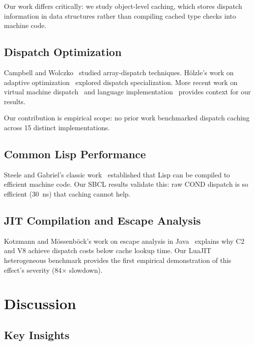 \documentclass[sigplan,final]{acmart}
\begin{document}
Our work differs critically: we study object-level caching, which stores dispatch information in
data structures rather than compiling cached type checks into machine code.

\subsection{Dispatch Optimization}

Campbell and Wolczko~\cite{campbell1992array} studied array-dispatch techniques. Hölzle's work
on adaptive optimization~\cite{hoelzle1994adaptive} explored dispatch specialization. More recent
work on virtual machine dispatch~\cite{ahn2014fast} and language implementation~\cite{tobin2017performance}
provides context for our results.

Our contribution is empirical scope: no prior work benchmarked dispatch caching across 15
distinct implementations.

\subsection{Common Lisp Performance}

Steele and Gabriel's classic work~\cite{steele1990lisp} established that Lisp can be compiled
to efficient machine code. Our SBCL results validate this: raw COND dispatch is so efficient
(30~ns) that caching cannot help.

\subsection{JIT Compilation and Escape Analysis}

Kotzmann and Mössenböck's work on escape analysis in Java~\cite{kotzmann2005escape} explains
why C2 and V8 achieve dispatch costs below cache lookup time. Our LuaJIT heterogeneous benchmark
provides the first empirical demonstration of this effect's severity (84× slowdown).

\section{Discussion}

\subsection{Key Insights}
\end{document}
